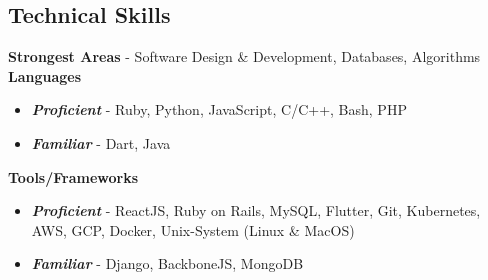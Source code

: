 \documentclass[margin, centered]{res}
\begin{document}
\begin{resume}
    \section{Technical \hspace{2mm} Skills}
    \textbf{Strongest Areas} - Software Design \& Development, Databases, Algorithms \\
    \textbf{Languages}
    \begin{itemize}
        \item \textbf{\textsl{Proficient}} - Ruby, Python, JavaScript, C/C++, Bash, PHP
        \item \textbf{\textsl{Familiar}} - Dart, Java
    \end{itemize}
    \textbf{Tools/Frameworks}
    \begin{itemize}
        \item \textbf{\textsl{Proficient}} - ReactJS, Ruby on Rails, MySQL, Flutter, Git, Kubernetes, AWS, GCP, Docker, Unix-System (Linux \& MacOS)
        \item \textbf{\textsl{Familiar}} - Django, BackboneJS, MongoDB
    \end{itemize}




\end{resume}
\end{document}
